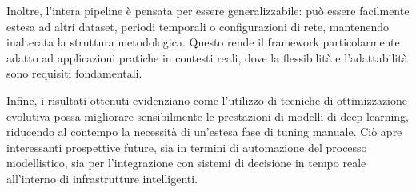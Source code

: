 \documentclass{article}
\begin{document}
Inoltre, l’intera pipeline è pensata per essere generalizzabile: può essere facilmente estesa ad altri dataset, periodi temporali o configurazioni di rete, mantenendo inalterata la struttura metodologica. Questo rende il framework particolarmente adatto ad applicazioni pratiche in contesti reali, dove la flessibilità e l’adattabilità sono requisiti fondamentali.

Infine, i risultati ottenuti evidenziano come l’utilizzo di tecniche di ottimizzazione evolutiva possa migliorare sensibilmente le prestazioni di modelli di deep learning, riducendo al contempo la necessità di un’estesa fase di tuning manuale. Ciò apre interessanti prospettive future, sia in termini di automazione del processo modellistico, sia per l’integrazione con sistemi di decisione in tempo reale all’interno di infrastrutture intelligenti.



\end{document}
